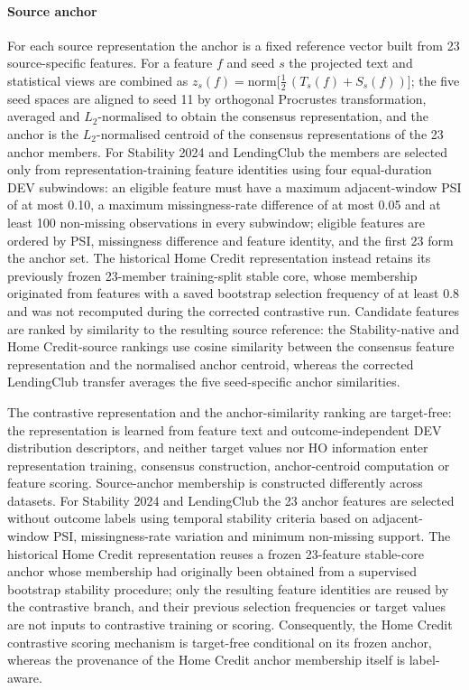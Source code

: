 \documentclass[final,5p,twocolumn]{elsarticle}
\begin{document}
\paragraph{Source anchor}
For each source representation the anchor is a fixed reference vector built from 23 source-specific features. For a feature $f$ and seed $s$ the projected text and statistical views are combined as $z_s(f)=\mathrm{norm}\big[\tfrac12\,(T_s(f)+S_s(f))\big]$; the five seed spaces are aligned to seed 11 by orthogonal Procrustes transformation, averaged and $L_2$-normalised to obtain the consensus representation, and the anchor is the $L_2$-normalised centroid of the consensus representations of the 23 anchor members. For Stability 2024 and LendingClub the members are selected only from representation-training feature identities using four equal-duration DEV subwindows: an eligible feature must have a maximum adjacent-window PSI of at most 0.10, a maximum missingness-rate difference of at most 0.05 and at least 100 non-missing observations in every subwindow; eligible features are ordered by PSI, missingness difference and feature identity, and the first 23 form the anchor set. The historical Home Credit representation instead retains its previously frozen 23-member training-split stable core, whose membership originated from features with a saved bootstrap selection frequency of at least 0.8 and was not recomputed during the corrected contrastive run. Candidate features are ranked by similarity to the resulting source reference: the Stability-native and Home Credit-source rankings use cosine similarity between the consensus feature representation and the normalised anchor centroid, whereas the corrected LendingClub transfer averages the five seed-specific anchor similarities.

The contrastive representation and the anchor-similarity ranking are target-free: the representation is learned from feature text and outcome-independent DEV distribution descriptors, and neither target values nor HO information enter representation training, consensus construction, anchor-centroid computation or feature scoring. Source-anchor membership is constructed differently across datasets. For Stability 2024 and LendingClub the 23 anchor features are selected without outcome labels using temporal stability criteria based on adjacent-window PSI, missingness-rate variation and minimum non-missing support. The historical Home Credit representation reuses a frozen 23-feature stable-core anchor whose membership had originally been obtained from a supervised bootstrap stability procedure; only the resulting feature identities are reused by the contrastive branch, and their previous selection frequencies or target values are not inputs to contrastive training or scoring. Consequently, the Home Credit contrastive scoring mechanism is target-free conditional on its frozen anchor, whereas the provenance of the Home Credit anchor membership itself is label-aware.
\end{document}
